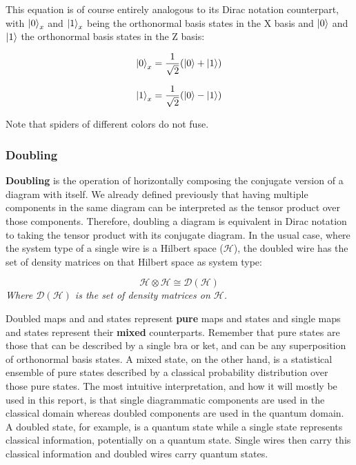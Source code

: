 \documentclass[]{article}
\begin{document}
This equation is of course entirely analogous to its Dirac notation counterpart, with $\ket{0}_x$ and $\ket{1}_x$ being the orthonormal basis states in the X basis and $\ket{0}$ and $\ket{1}$ the orthonormal basis states in the Z basis:

\begin{equation}
\ket{0}_x = \frac{1}{\sqrt{2}}(\ket{0} + \ket{1})
\end{equation}

\begin{equation}
\ket{1}_x = \frac{1}{\sqrt{2}}(\ket{0} - \ket{1})
\end{equation}

Note that spiders of different colors do not fuse.

\subsubsection{Doubling}
\label{doubling}

\textbf{Doubling} is the operation of horizontally composing the conjugate version of a diagram with itself. We already defined previously that having multiple components in the same diagram can be interpreted as the tensor product over those components. Therefore, doubling a diagram is equivalent in Dirac notation to taking the tensor product with its conjugate diagram. In the usual case, where the system type of a single wire is a Hilbert space ($\mathcal{H}$), the doubled wire has the set of density matrices on that Hilbert space as system type:

\begin{equation}
\mathcal{H} \otimes \mathcal{H} \cong \mathcal{D}(\mathcal{H})
\end{equation}
\textit{Where $\mathcal{D}(\mathcal{H})$ is the set of density matrices on $\mathcal{H}$.}

Doubled maps and and states represent \textbf{pure} maps and states and single maps and states represent their \textbf{mixed} counterparts. Remember that pure states are those that can be described by a single bra or ket, and can be any superposition of orthonormal basis states. A mixed state, on the other hand, is a statistical ensemble of pure states described by a classical probability distribution over those pure states. The most intuitive interpretation, and how it will mostly be used in this report, is that single diagrammatic components are used in the classical domain whereas doubled components are used in the quantum domain. A doubled state, for example, is a quantum state while a single state represents classical information, potentially on a quantum state. Single wires then carry this classical information and doubled wires carry quantum states.
\end{document}
